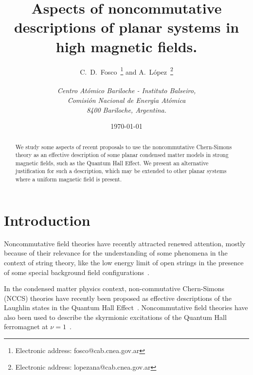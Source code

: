 \documentclass[a4paper,12pt]{article}
\begin{document}
\title{Aspects of noncommutative descriptions of planar systems in
  high magnetic fields.}  \author{C.~D.~Fosco~\footnote{Electronic
    address: fosco@cab.cnea.gov.ar} and
A.~L{\'o}pez~\footnote{Electronic
    address: lopezana@cab.cnea.gov.ar}
  \\ \\
  {\normalsize\it Centro At{\'o}mico Bariloche - Instituto
Balseiro,}\\
  {\normalsize\it Comisi{\'o}n Nacional de Energ{\'\i}a
At{\'o}mica}\\
  {\normalsize\it 8400 Bariloche, Argentina.}}  \date{\today}
\maketitle
\begin{abstract}
\noindent
We study some aspects of recent proposals to use the noncommutative
Chern-Simons theory as an effective description of some planar
condensed matter models in strong magnetic fields, such as the
Quantum
Hall Effect.  We present an alternative justification for such a
description, which may be extended to other planar systems where a
uniform magnetic field is present.
\end{abstract}
\bigskip \newpage
\section{Introduction}

Noncommutative field theories have recently attracted renewed
attention, mostly because of their relevance for the understanding
of
some phenomena in the context of string theory, like the low energy
limit of open strings in the presence of some special background
field
configurations~\cite{castellani,DN}.

In the condensed matter physics context, non-commutative
Chern-Simons
(NCCS) theories have recently been proposed as effective
descriptions
of the Laughlin states in the Quantum Hall
Effect~\cite{susskind,PP,KS}.  Noncommutative field theories have
also
been used to describe the skyrmionic excitations of the Quantum
Hall
ferromagnet at $\nu=1$~\cite{PA, LMR}.
\end{document}
